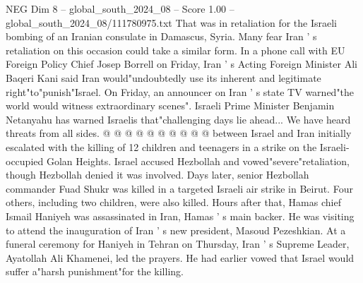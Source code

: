 \begin{textsample}{NEG Dim 8 – global\_south\_2024\_08 – Score 1.00 – global\_south\_2024\_08/111780975.txt}
That was in retaliation for the Israeli bombing of an Iranian consulate in Damascus, Syria.
Many fear Iran ' s retaliation on this occasion could take a similar form.
In a phone call with EU Foreign Policy Chief Josep Borrell on Friday, Iran ' s Acting Foreign Minister Ali Baqeri Kani said Iran would"undoubtedly use its inherent and legitimate right"to"punish"Israel.
On Friday, an announcer on Iran ' s state TV warned"the world would witness extraordinary scenes".
Israeli Prime Minister Benjamin Netanyahu has warned Israelis that"challenging days lie ahead...
We have heard threats from all sides. @ @ @ @ @ @ @ @ @ @ between Israel and Iran initially escalated with the killing of 12 children and teenagers in a strike on the Israeli-occupied Golan Heights.
Israel accused Hezbollah and vowed"severe"retaliation, though Hezbollah denied it was involved.
Days later, senior Hezbollah commander Fuad Shukr was killed in a targeted Israeli air strike in Beirut.
Four others, including two children, were also killed.
Hours after that, Hamas chief Ismail Haniyeh was assassinated in Iran, Hamas ' s main backer.
He was visiting to attend the inauguration of Iran ' s new president, Masoud Pezeshkian.
At a funeral ceremony for Haniyeh in Tehran on Thursday, Iran ' s Supreme Leader, Ayatollah Ali Khamenei, led the prayers.
He had earlier vowed that Israel would suffer a"harsh punishment"for the killing.

\end{textsample}
